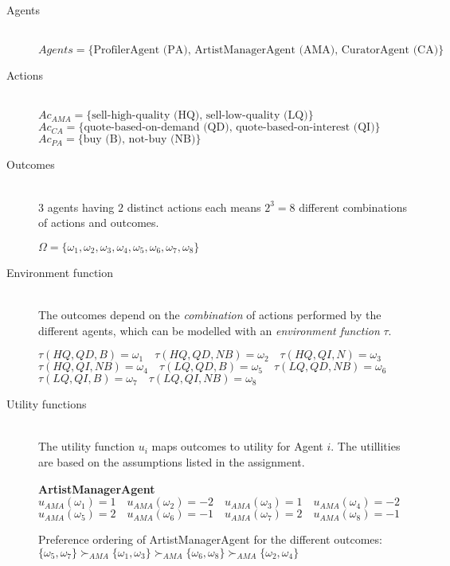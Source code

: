 \documentclass[a4paper, 11pt]{article}
\begin{document}
\begin{description}
\item[Agents] \hfill \\
$Agents = \{\text{ProfilerAgent (PA), ArtistManagerAgent (AMA), CuratorAgent (CA)}\}$

\item[Actions] \hfill \\
$Ac_{AMA} = \{\text{sell-high-quality (HQ), sell-low-quality (LQ)}\}$\\
$Ac_{CA} = \{\text{quote-based-on-demand (QD), quote-based-on-interest (QI)}\}$\\
$Ac_{PA} = \{\text{buy (B), not-buy (NB)}\}$

\item[Outcomes]\hfill\\
$3$ agents having $2$ distinct actions each means $2^3 = 8$ different combinations of actions and outcomes.
 
$\Omega = \{\omega_1, \omega_2, \omega_3, \omega_4, \omega_5, \omega_6, \omega_7, \omega_8\}$

\item[Environment function] \hfill\\
The outcomes depend on the \textit{combination} of actions performed by the different agents, which can be modelled with an \textit{environment function} $\tau$. 

$\tau(HQ, QD, B) = \omega_1 \quad \tau(HQ, QD, NB) = \omega_2 \quad \tau(HQ, QI, N) = \omega_3$\\
$\tau(HQ, QI, NB) = \omega_4 \quad \tau(LQ, QD, B) = \omega_5 \quad \tau(LQ, QD, NB) = \omega_6$\\
$\tau(LQ, QI, B) = \omega_7 \quad \tau(LQ, QI, NB) = \omega_8$

\item[Utility functions] \hfill\\
The utility function $u_i$ maps outcomes to utility for Agent $i$. The utillities are based on the assumptions listed in the assignment.

\textbf{ArtistManagerAgent}\\
$u_{AMA}(\omega_1) = 1 \quad u_{AMA}(\omega_2) = -2 \quad u_{AMA}(\omega_3) = 1 \quad u_{AMA}(\omega_4) = -2$ \\
$u_{AMA}(\omega_5) = 2 \quad u_{AMA}(\omega_6) = -1 \quad u_{AMA}(\omega_7) = 2 \quad u_{AMA}(\omega_8) = -1$

Preference ordering of ArtistManagerAgent for the different outcomes:\\
$\{\omega_5, \omega_7\}\succ_{AMA} \{\omega_1, \omega_3\} \succ_{AMA} \{\omega_6, \omega_8\} \succ_{AMA} \{\omega_2, \omega_4\}$


\end{description}
\end{document}
